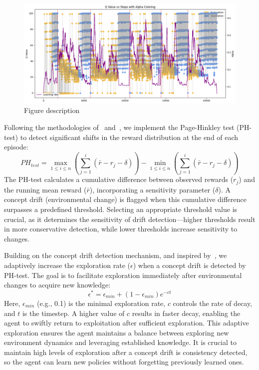 \begin{figure}
    \centering
    \includegraphics[width=\textwidth]{figures/alpha.png}
    \caption{Figure description}
    \label{fig:alpha}
  \end{figure}

Following the methodologies of~\citet{mignon2017adaptive} and~\citet{networkdynamicrl}, we implement the Page-Hinkley test (PH-test) to detect significant shifts in the reward distribution at the end of each episode:
\begin{equation}
    \label{eq:ph_test}
    PH_{test} = \max_{1 \leq i \leq n} \left(\sum_{j=1}^{i}(\bar{r}-r_j-\delta)\right) - \min_{1 \leq i \leq n}\left(\sum_{j=1}^{i}(\bar{r}-r_j-\delta)\right)
\end{equation}
The PH-test calculates a cumulative difference between observed rewards ($r_j$) and the running mean reward ($\bar{r}$), incorporating a sensitivity parameter ($\delta$). A concept drift (environmental change) is flagged when this cumulative difference surpasses a predefined threshold. Selecting an appropriate threshold value is crucial, as it determines the sensitivity of drift detection—higher thresholds result in more conservative detection, while lower thresholds increase sensitivity to changes.

Building on the concept drift detection mechanism, and inspired by~\citet{mignon2017adaptive}, we adaptively increase the exploration rate ($\epsilon$) when a concept drift is detected by PH-test. The goal is to facilitate exploration immediately after environmental changes to acquire new knowledge:
\begin{equation}
    \label{eq:epsilon_greedy}
    \epsilon^* = \epsilon_{min} + (1-\epsilon_{min}) e^{-ct}
\end{equation}
Here, $\epsilon_{min}$ (e.g., 0.1) is the minimal exploration rate, $c$ controls the rate of decay, and $t$ is the timestep. A higher value of $c$ results in faster decay, enabling the agent to swiftly return to exploitation after sufficient exploration. This adaptive exploration ensures the agent maintains a balance between exploring new environment dynamics and leveraging established knowledge. It is crucial to maintain high levels of exploration after a concept drift is consistency detected, so the agent can learn new policies  without forgetting previously learned ones.

